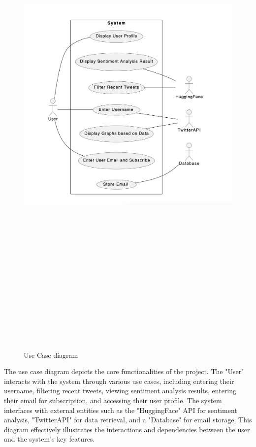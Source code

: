 \documentclass[a4paper,12pt]{article}
\begin{document}
{{{		\begin{figure}[htbp]
			\centering
			\includegraphics[width=6in, height=10in, keepaspectratio]{Usecase.png}
			\label{usecase_diagram}
			\caption{Use Case diagram}
		\end{figure}
								
				
	The use case diagram depicts the core functionalities of the project. The "User" interacts with the system through various use cases, including entering their username, filtering recent tweets, viewing sentiment analysis results, entering their email for subscription, and accessing their user profile. The system interfaces with external entities such as the "HuggingFace" API for sentiment analysis, "TwitterAPI" for data retrieval, and a "Database" for email storage. This diagram effectively illustrates the interactions and dependencies between the user and the system's key features.

}}}
\end{document}
